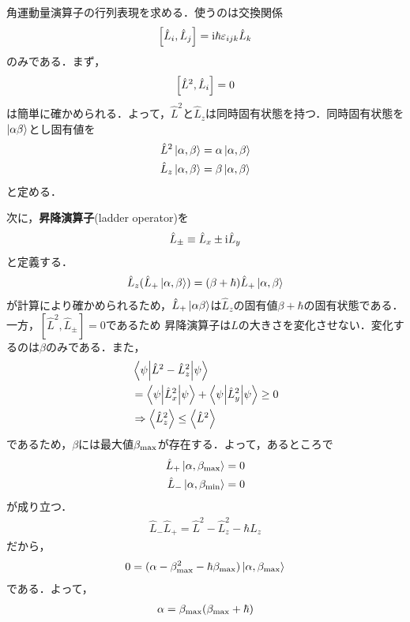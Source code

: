\documentclass{report}
\begin{document}
角運動量演算子の行列表現を求める．使うのは交換関係
\begin{align}
  \qty[\hat{L}_i,\hat{L}_j] = \mathrm{i}\hbar\varepsilon_{ijk}\hat{L}_k \label{commutation-of-am}
\end{align}
のみである．まず，
\begin{align}
  \qty[\hat{L}^2, \hat{L}_i] = 0
\end{align}
は簡単に確かめられる．よって，$\hat{L}^2$と$\hat{L}_z$は同時固有状態を持つ．同時固有状態を$\ket{\alpha\beta}$とし固有値を
\begin{align}
  \hat{L}^2\ket{\alpha,\beta} &= \alpha\ket{\alpha,\beta}\\
  \hat{L}_z\ket{\alpha,\beta} &= \beta\ket{\alpha,\beta}
\end{align}
と定める．

次に，\textbf{昇降演算子}(ladder operator)を
\begin{align}
  \hat{L}_{\pm} \equiv \hat{L}_x \pm \mathrm{i} \hat{L}_y
\end{align}
と定義する．
\begin{align}
  \hat{L}_z(\hat{L}_{+}\ket{\alpha,\beta}) = (\beta + \hbar)\hat{L}_{+}\ket{\alpha,\beta}
\end{align}
が計算により確かめられるため，$\hat{L}_{+}\ket{\alpha\beta}$は$\hat{L}_z$の固有値$\beta+\hbar$の固有状態である．一方，$[\hat{L}^2, \hat{L}_{\pm}]=0$であるため
昇降演算子は$L$の大きさを変化させない．変化するのは$\beta$のみである．また，
\begin{align}
  &\mel**{\psi}{\hat{L}^2 - \hat{L}_z^2 }{\psi}\\
  &= \mel**{\psi}{\hat{L}_x^2}{\psi} + \mel**{\psi}{\hat{L}_y^2}{\psi} \geq 0\\
  &\Rightarrow \ev{ \hat{L}_z^2 } \leq \ev{ \hat{L}^2 }
\end{align}
であるため，$\beta$には最大値$\beta_{\mathrm{max}}$が存在する．よって，あるところで
\begin{align}
  \hat{L}_{+}\ket{\alpha,\beta_{\mathrm{max}}} &= 0\\
  \hat{L}_{-}\ket{\alpha,\beta_{\mathrm{min}}} &= 0
\end{align}
が成り立つ．
\begin{align}
  \hat{L}_{-}\hat{L}_{+} = \hat{L}^2 - \hat{L}_z^2 - \hbar \hat{L}_z
\end{align}
だから，
\begin{align}
  0 = (\alpha - \beta_{\mathrm{max}}^2 - \hbar \beta_{\mathrm{\max}})\ket{\alpha,\beta_{\mathrm{max}}}
\end{align}
である．よって，
\begin{align}
  \alpha = \beta_{\mathrm{max}}(\beta_{\mathrm{max}} + \hbar)
\end{align}
\end{document}
